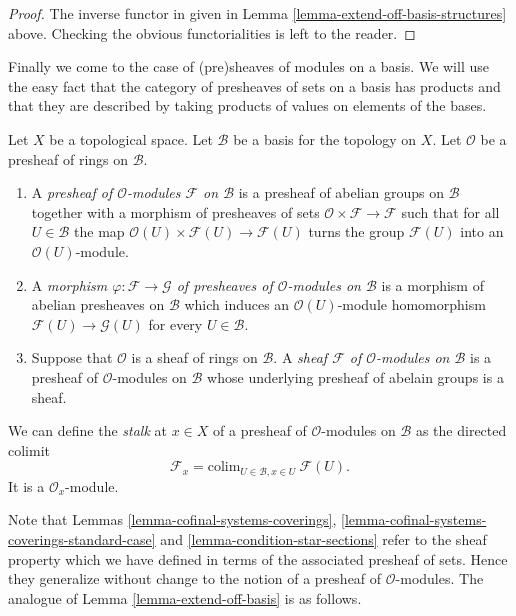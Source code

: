 \begin{proof}
The inverse functor in given in
Lemma \ref{lemma-extend-off-basis-structures} above.
Checking the obvious functorialities is left to the
reader.
\end{proof}


\medskip\noindent
Finally we come to the case of (pre)sheaves of modules
on a basis. We will use the easy fact that the category
of presheaves of sets on a basis has products and that
they are described by taking products of values on
elements of the bases.

\begin{definition}
\label{definition-sheaf-modules-basis}
Let $X$ be a topological space. Let $\mathcal{B}$ be a
basis for the topology on $X$. Let $\mathcal{O}$ be
a presheaf of rings on $\mathcal{B}$.
\begin{enumerate}
\item A {\it presheaf of $\mathcal{O}$-modules $\mathcal{F}$
on $\mathcal{B}$} is a presheaf of abelian groups on
$\mathcal{B}$ together with a morphism of presheaves
of sets $\mathcal{O} \times \mathcal{F} \to \mathcal{F}$
such that for all $U \in \mathcal{B}$ the map
$\mathcal{O}(U) \times \mathcal{F}(U) \to \mathcal{F}(U)$
turns the group $\mathcal{F}(U)$ into an $\mathcal{O}(U)$-module.
\item A {\it morphism $\varphi : \mathcal{F} \to \mathcal{G}$
of presheaves of $\mathcal{O}$-modules on $\mathcal{B}$}
is a morphism of abelian presheaves on $\mathcal{B}$
which induces an $\mathcal{O}(U)$-module homomorphism
$\mathcal{F}(U) \to \mathcal{G}(U)$ for every $U \in \mathcal{B}$.
\item Suppose that $\mathcal{O}$ is a sheaf of rings
on $\mathcal{B}$. A {\it sheaf $\mathcal{F}$ of $\mathcal{O}$-modules
on $\mathcal{B}$} is a presheaf of $\mathcal{O}$-modules
on $\mathcal{B}$ whose underlying presheaf of abelain groups
is a sheaf.
\end{enumerate}
\end{definition}

\noindent
We can define the {\it stalk} at $x \in X$
of a presheaf of $\mathcal{O}$-modules on $\mathcal{B}$
as the directed colimit
$$
\mathcal{F}_x = \text{colim}_{U\in \mathcal{B}, x\in U}\ \mathcal{F}(U).
$$
It is a $\mathcal{O}_x$-module.

\medskip\noindent
Note that Lemmas \ref{lemma-cofinal-systems-coverings},
\ref{lemma-cofinal-systems-coverings-standard-case} and
\ref{lemma-condition-star-sections} refer to the sheaf
property which we have defined in terms of the associated presheaf
of sets. Hence they generalize without change to the notion
of a presheaf of $\mathcal{O}$-modules. The analogue of
Lemma \ref{lemma-extend-off-basis} is as follows.


